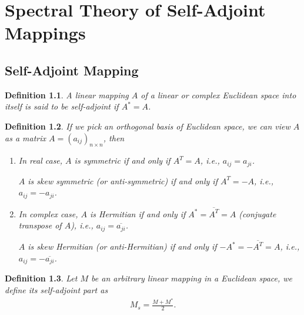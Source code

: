 \documentclass[11pt]{book}
\newtheorem{definition}{Definition}[chapter]
\theoremstyle{definition}
\numberwithin{equation}{chapter}
\begin{document}
\chapter{Spectral Theory of Self-Adjoint Mappings}
\section{Self-Adjoint Mapping}
\begin{definition}
A linear mapping $A$ of a linear or complex Euclidean space into itself is said to be self-adjoint if $A^* = A$.
\end{definition}

\begin{definition}
If we pick an orthogonal basis of Euclidean space, we can view $A$ as a matrix $A = (a_{ij})_{n\times n}$, then 
\begin{enumerate}[label=(\arabic*)]
    \item In real case, $A$ is symmetric if and only if $A^T = A$, i.e., $a_{ij} = a_{ji}$.
    
    $A$ is skew symmetric (or anti-symmetric) if and only if $A^T = -A$, i.e., $a_{ij} = -a_{ji}$.
    
    \item In complex case, $A$ is Hermitian if and only if $A^* = \overline{A^T} = A$ (conjugate transpose of $A$), i.e., $a_{ij} = \overline{a_{ji}}$.
    
    $A$ is skew Hermitian (or anti-Hermitian) if and only if $- A^* = - \overline{A^T} = A$, i.e., $a_{ij} = - \overline{a_{ji}}$.
\end{enumerate}
\end{definition}

\medskip

\begin{definition}
Let $M$ be an arbitrary linear mapping in a Euclidean space, we define its self-adjoint part as 
\begin{align*}
    M_s = \frac{M + M^*}{2}.
\end{align*}
\end{definition}

\medskip
\end{document}
